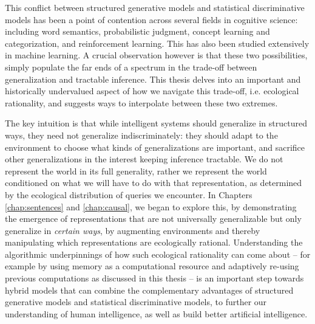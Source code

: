 This conflict between structured generative models and statistical discriminative models has been a point of contention across several fields in cognitive science: including word semantics\cite{steyvers2007probabilistic, rogers2004semantic, gleitman1990structural}, probabilistic judgment\citep{oaksford2007bayesian, tversky1974judgment}, concept learning and categorization\citep{bruner2017study, medin1978context, shepard1987toward}, and reinforcement learning\citep{gershman2014retrospective, daw2011model, kool2017cost}. This has also been studied extensively in machine learning\citep{ng2002discriminative, lake2017building}. A crucial observation however is that these two possibilities, simply populate the far ends of a spectrum in the trade-off between generalization and tractable inference. This thesis delves into an important and historically undervalued aspect of how we navigate this trade-off, i.e. ecological rationality, and suggests ways to interpolate between these two extremes.

 The key intuition is that while intelligent systems should generalize in structured ways, they need not generalize indiscriminately: they should adapt to the environment to choose what kinds of generalizations are important, and sacrifice other generalizations in the interest keeping inference tractable. We do not represent the world in its full generality, rather we represent the world conditioned on what we will have to do with that representation, as determined by the ecological distribution of queries we encounter. In Chapters \ref{chap:sentences} and \ref{chap:causal}, we began to explore this, by demonstrating the emergence of representations that are not universally generalizable but only generalize in \textit{certain ways}, by augmenting environments and thereby manipulating which representations are ecologically rational.  Understanding the algorithmic underpinnings of how such ecological rationality can come about -- for example by using memory as a computational resource and adaptively re-using previous computations as discussed in this thesis -- is an important step towards hybrid models that can combine the complementary advantages of structured generative models and statistical discriminative models, to further our understanding of human intelligence, as well as build better artificial intelligence.





